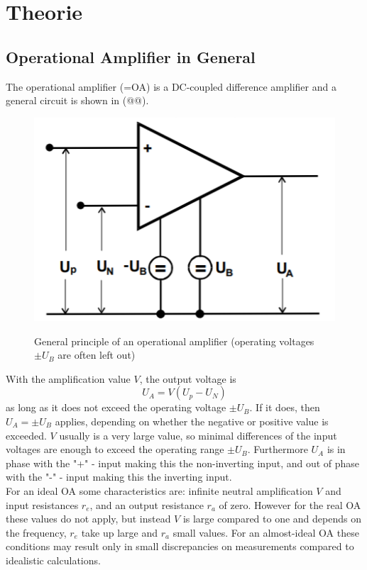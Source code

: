 \section{Theorie}
\subsection{Operational Amplifier in General}
The operational amplifier (=OA) is a DC-coupled difference amplifier and a general circuit is shown in
(@@).
\begin{figure}[H]
  \centering
  \includegraphics[scale=1]{V51Bilder/t1.png}
  \caption{General principle of an operational amplifier (operating voltages $\pm U_B$ are often left out)} \label{fig:t1} \cite{1}
\end{figure}
\noindent
With the amplification value $V$, the output voltage is
\begin{equation}
U_A = V(U_p - U_N) \label{eq:1}
\end{equation}
as long as it does not exceed the operating voltage $\pm U_B$. If it does, then $U_A = \pm U_B$ applies, depending on whether
the negative or positive value is exceeded. $V$ usually is a very large value, so minimal differences of the input voltages are enough
to exceed the operating range $\pm U_B$. Furthermore $U_A$ is in phase with the "+" - input making this the non-inverting input, and out of phase
with the "-" - input making this the inverting input.
\\
\noindent
For an ideal OA some characteristics are: infinite neutral amplification $V$ and input resistances $r_e$, and an output resistance $r_a$ of zero.
However for the real OA these values do not apply, but instead $V$ is large compared to one and depends on the frequency, $r_e$ take up large and $r_a$ small values.
For an almost-ideal OA these conditions may result only in small discrepancies on measurements compared to idealistic calculations.

